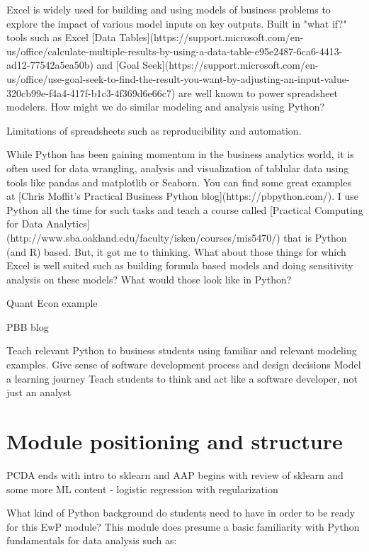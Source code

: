 \documentclass[ited,blindrev]{informs3}              %
\begin{document}
Excel is widely used for building and using models of business problems to explore the impact of various model inputs on key outputs. Built in "what if?" tools such as Excel [Data Tables](https://support.microsoft.com/en-us/office/calculate-multiple-results-by-using-a-data-table-e95e2487-6ca6-4413-ad12-77542a5ea50b) and [Goal Seek](https://support.microsoft.com/en-us/office/use-goal-seek-to-find-the-result-you-want-by-adjusting-an-input-value-320cb99e-f4a4-417f-b1c3-4f369d6e66c7) are well known to power spreadsheet modelers. How might we do similar modeling and analysis using Python?

Limitations of spreadsheets such as reproducibility and automation.


While Python has been gaining momentum in the business analytics world, it is often used for data wrangling, analysis and visualization of tablular data using tools like pandas and matplotlib or Seaborn. You can find some great examples at [Chris Moffit's Practical Business Python blog](https://pbpython.com/). I use Python all the time for such tasks and teach a course called [Practical Computing for Data Analytics](http://www.sba.oakland.edu/faculty/isken/courses/mis5470/) that is Python (and R) based. But, it got me to thinking. What about those things for which Excel is well suited such as building formula based models and doing sensitivity analysis on these models? What would those look like in Python?

Quant Econ example

PBB blog


Teach relevant Python to business students using familiar and relevant modeling examples.
Give sense of software development process and design decisions
Model a learning journey
Teach students to think and act like a software developer, not just an analyst

\section{Module positioning and structure}

PCDA ends with intro to sklearn and AAP begins with review of sklearn and some more ML content - logistic regression with regularization

What kind of Python background do students need to have in order to be ready for this EwP module? This module does presume a basic familiarity with Python fundamentals for data analysis such as:
\end{document}
